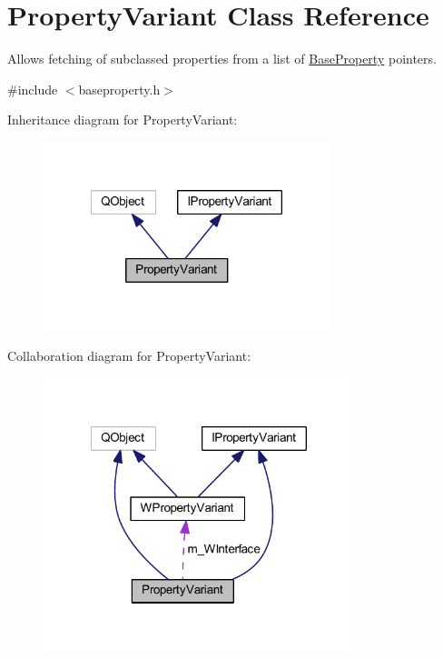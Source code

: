\hypertarget{class_property_variant}{\section{Property\-Variant Class Reference}
\label{class_property_variant}
}


Allows fetching of subclassed properties from a list of \hyperlink{class_base_property}{Base\-Property} pointers.  




{\ttfamily \#include $<$baseproperty.\-h$>$}



Inheritance diagram for Property\-Variant\-:
\nopagebreak
\begin{figure}[H]
\begin{center}
\leavevmode
\includegraphics[width=237pt]{class_property_variant__inherit__graph}
\end{center}
\end{figure}


Collaboration diagram for Property\-Variant\-:
\nopagebreak
\begin{figure}[H]
\begin{center}
\leavevmode
\includegraphics[width=257pt]{class_property_variant__coll__graph}
\end{center}
\end{figure}
